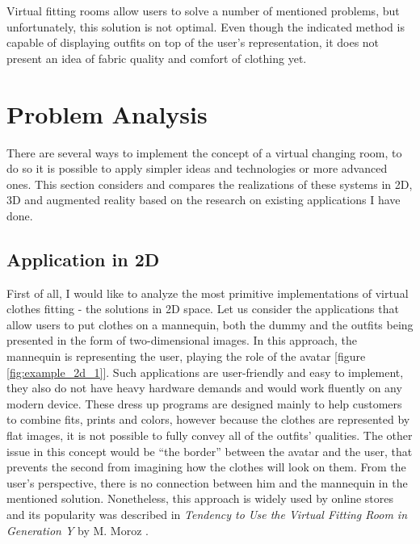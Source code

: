 \documentclass[a4paper]{report}
\begin{document}
\bigskip Virtual fitting rooms allow users to solve a number of mentioned problems, but unfortunately, this solution is not optimal. Even though the indicated method is capable of displaying outfits on top of the user’s representation, it does not present an idea of fabric quality and comfort of clothing yet.




\chapter{Problem Analysis}
\label{chapter_problemAnalysis}

\qquad There are several ways to implement the concept of a virtual changing room, to do so it is possible to apply simpler ideas and technologies or more advanced ones. This section considers and compares the realizations of these systems in 2D, 3D and augmented reality based on the research on existing applications I have done.



\section{Application in 2D}

\qquad First of all, I would like to analyze the most primitive implementations of virtual clothes fitting -  the solutions in 2D space. Let us consider the applications that allow users to put clothes on a mannequin, both the dummy and the outfits being presented in the form of two-dimensional images. In this approach, the mannequin is representing the user, playing the role of the avatar [figure \ref{fig:example_2d_1}]. Such applications are user-friendly and easy to implement, they also do not have heavy hardware demands and would work fluently on any modern device. These dress up programs are designed mainly to help customers to combine fits, prints and colors, however because the clothes are represented by flat images, it is not possible to fully convey all of the outfits’ qualities. The other issue in this concept would be “the border” between the avatar and the user, that prevents the second from imagining how the clothes will look on them. From the user's perspective, there is no connection between him and the mannequin in the mentioned solution. Nonetheless, this approach is widely used by online stores and its popularity was described in \textit{Tendency to Use the Virtual Fitting Room in Generation Y} by M. Moroz \cite[p. 242]{VFR_management}.
\end{document}
